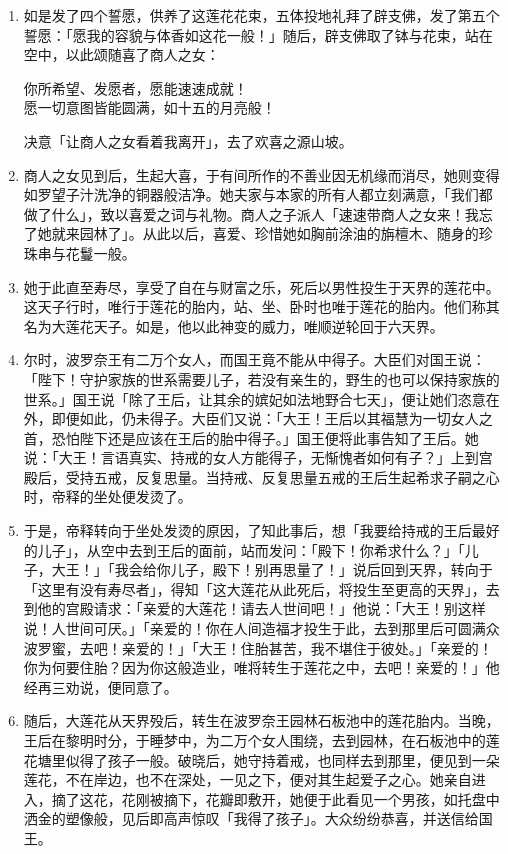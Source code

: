 \begin{enumerate}
\item 如是发了四个誓愿，供养了这莲花花束，五体投地礼拜了辟支佛，发了第五个誓愿：「愿我的容貌与体香如这花一般！」随后，辟支佛取了钵与花束，站在空中，以此颂随喜了商人之女：\begin{quoting}你所希望、发愿者，愿能速速成就！\\愿一切意图皆能圆满，如十五的月亮般！\end{quoting}决意「让商人之女看着我离开」，去了欢喜之源山坡。
\item 商人之女见到后，生起大喜，于有间所作的不善业因无机缘而消尽，她则变得如罗望子汁洗净的铜器般洁净。她夫家与本家的所有人都立刻满意，「我们都做了什么」，致以喜爱之词与礼物。商人之子派人「速速带商人之女来！我忘了她就来园林了」。从此以后，喜爱、珍惜她如胸前涂油的旃檀木、随身的珍珠串与花鬘一般。
\item 她于此直至寿尽，享受了自在与财富之乐，死后以男性投生于天界的莲花中。这天子行时，唯行于莲花的胎内，站、坐、卧时也唯于莲花的胎内。他们称其名为大莲花天子。如是，他以此神变的威力，唯顺逆轮回于六天界。
\item 尔时，波罗奈王有二万个女人，而国王竟不能从中得子。大臣们对国王说：「陛下！守护家族的世系需要儿子，若没有亲生的，野生的也可以保持家族的世系。」国王说「除了王后，让其余的嫔妃如法地野合七天」，便让她们恣意在外，即便如此，仍未得子。大臣们又说：「大王！王后以其福慧为一切女人之首，恐怕陛下还是应该在王后的胎中得子。」国王便将此事告知了王后。她说：「大王！言语真实、持戒的女人方能得子，无惭愧者如何有子？」上到宫殿后，受持五戒，反复思量。当持戒、反复思量五戒的王后生起希求子嗣之心时，帝释的坐处便发烫了。
\item 于是，帝释转向于坐处发烫的原因，了知此事后，想「我要给持戒的王后最好的儿子」，从空中去到王后的面前，站而发问：「殿下！你希求什么？」「儿子，大王！」「我会给你儿子，殿下！别再思量了！」说后回到天界，转向于「这里有没有寿尽者」，得知「这大莲花从此死后，将投生至更高的天界」，去到他的宫殿请求：「亲爱的大莲花！请去人世间吧！」他说：「大王！别这样说！人世间可厌。」「亲爱的！你在人间造福才投生于此，去到那里后可圆满众波罗蜜，去吧！亲爱的！」「大王！住胎甚苦，我不堪住于彼处。」「亲爱的！你为何要住胎？因为你这般造业，唯将转生于莲花之中，去吧！亲爱的！」他经再三劝说，便同意了。
\item 随后，大莲花从天界殁后，转生在波罗奈王园林石板池中的莲花胎内。当晚，王后在黎明时分，于睡梦中，为二万个女人围绕，去到园林，在石板池中的莲花塘里似得了孩子一般。破晓后，她守持着戒，也同样去到那里，便见到一朵莲花，不在岸边，也不在深处，一见之下，便对其生起爱子之心。她亲自进入，摘了这花，花刚被摘下，花瓣即敷开，她便于此看见一个男孩，如托盘中洒金的塑像般，见后即高声惊叹「我得了孩子」。大众纷纷恭喜，并送信给国王。

\end{enumerate}
